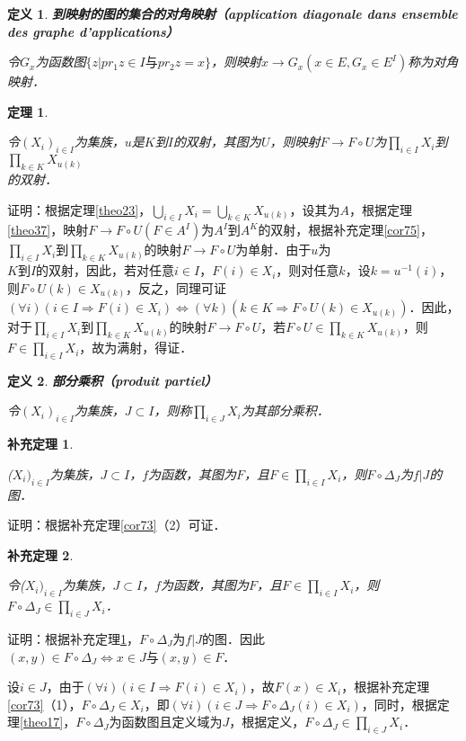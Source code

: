 \documentclass[12pt, a4paper, oneside]{book}
\newtheorem{theo}{定理}
\newtheorem{cor}{补充定理}
\newtheorem{de}{定义}
\begin{document}
			\begin{de}
				\textbf{到映射的图的集合的对角映射（application diagonale dans ensemble des graphe d'applications）}
				\par
				令$G_x$为函数图$\{z|pr_1z\in I\text{与}pr_2z=x\}$，则映射$x\to G_x(x\in E, G_x\in E^I)$称为对角映射．
			\end{de}
						
			\begin{theo}\label{theo40}
				\hfill\par
				令$(X_i)_{i\in I}$为集族，$u$是$K$到$I$的双射，其图为$U$，则映射$F\to F\circ U$为$\prod\limits_{i\in I}X_i$到$\prod\limits_{k\in K}X_{u(k)}$\\的双射．
			\end{theo}
			证明：根据定理\ref{theo23}，$\bigcup\limits_{i\in I}X_i=\bigcup\limits_{k\in K}X_{u(k)}$，设其为$A$，根据定理\ref{theo37}，映射$F\to F\circ U(F\in A^I)$为$A^I$到$A^K$的双射，根据补充定理\ref{cor75}，$\prod\limits_{i\in I}X_i$到$\prod\limits_{k\in K}X_{u(k)}$的映射$F\to F\circ U$为单射．由于$u$为\\$K$到$I$的双射，因此，若对任意$i\in I$，$F(i)\in X_i$，则对任意$k$，设$k=u^{-1}(i)$，则$F\circ U(k)\in X_{u(k)}$，反之，同理可证$(\forall i)(i\in I\Rightarrow F(i)\in X_i)\Leftrightarrow (\forall k)(k\in K\Rightarrow F\circ U(k)\in X_{u(k)})$．因此，对于$\prod\limits_{i\in I}X_i$到$\prod\limits_{k\in K}X_{u(k)}$的映射$F\to F\circ U$，若$F\circ U\in \prod\limits_{k\in K}X_{u(k)}$，则$F\in \prod\limits_{i\in I}X_i$，故为满射，得证．

			\begin{de}
				\textbf{部分乘积（produit partiel）}
				\par
				令$(X_i)_{i\in I}$为集族，$J\subset I$，则称$\prod\limits_{i\in J}X_i$为其部分乘积．			
			\end{de}
						
			\begin{cor}\label{cor135}
				\hfill\par
				($X_i)_{i\in I}$为集族，$J\subset I$，$f$为函数，其图为$F$，且$F\in \prod\limits_{i\in I}X_i$，则$F\circ \Delta_J$为$f|J$的图．
			\end{cor}
			证明：根据补充定理\ref{cor73}（2）可证．
				
			\begin{cor}\label{cor136}
				\hfill\par
				令($X_i)_{i\in I}$为集族，$J\subset I$，$f$为函数，其图为$F$，且$F\in \prod\limits_{i\in I}X_i$，则$F\circ \Delta_J\in \prod\limits_{i\in J}X_i$．
			\end{cor}
			证明：根据补充定理\ref{cor135}，$F\circ \Delta_J$为$f|J$的图．因此$(x, y)\in F\circ \Delta_J\Leftrightarrow x\in J\text{与}(x, y)\in F$．
			\par
			设$i\in J$，由于$(\forall i)(i\in I\Rightarrow F(i)\in X_i)$，故$F(x)\in X_i$，根据补充定理\ref{cor73}（1），$F\circ \Delta_J\in X_i$，即$(\forall i)(i\in J\Rightarrow F\circ \Delta_J (i)\in X_i)$，同时，根据定理\ref{theo17}，$F\circ \Delta_J$为函数图且定义域为$J$，根据定义，$F\circ \Delta_J\in \prod\limits_{i\in J}X_i$．
\end{document}

